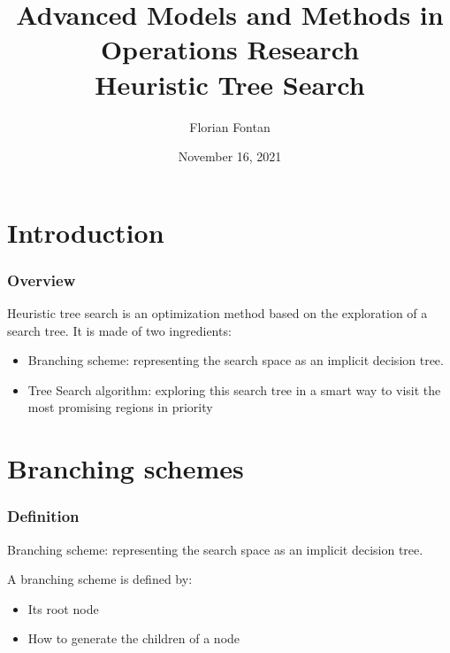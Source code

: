 \documentclass[10pt]{beamer}
\author{Florian Fontan}
\title{Advanced Models and Methods in Operations Research \\ Heuristic Tree Search}
\date{November 16, 2021}
\begin{document}
\newcommand{\customcite}[1]{\citetitle{#1}, \citeauthor{#1}, \citeyear{#1}}


\maketitle

\section{Introduction}

\begin{frame}
  \frametitle{Overview}

  Heuristic tree search is an optimization method based on the exploration of a search tree. It is made of two ingredients: \pause
  \begin{itemize}
    \item Branching scheme: representing the search space as an implicit decision tree. \pause
    \item Tree Search algorithm: exploring this search tree in a smart way to visit the most promising regions in priority
  \end{itemize}
\end{frame}

\section{Branching schemes}

\begin{frame}
  \frametitle{Definition}

  Branching scheme: representing the search space as an implicit decision tree.

  \bigskip

  A branching scheme is defined by:
  \begin{itemize}
    \item Its root node
    \item How to generate the children of a node
  \end{itemize}
\end{frame}
\end{document}
